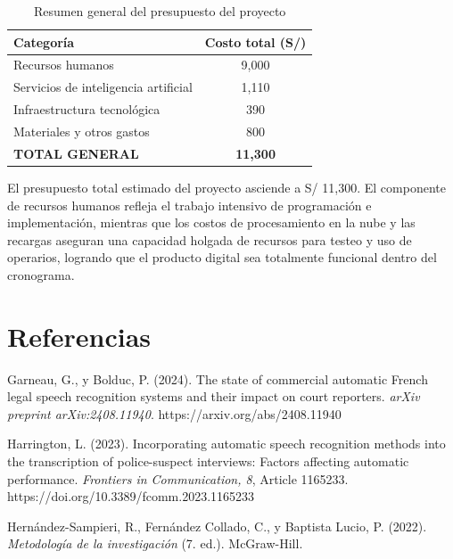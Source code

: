 \documentclass[12pt,a4paper,oneside]{article}
\begin{document}
\begin{table}[H]
\centering
\caption{Resumen general del presupuesto del proyecto}
\begin{tabular}{|p{6cm}|c|}
\hline
\rowcolor{gray!20}
\textbf{Categor\'ia} & \textbf{Costo total (S/)} \\
\hline
Recursos humanos & 9{,}000 \\
\hline
Servicios de inteligencia artificial & 1{,}110 \\
\hline
Infraestructura tecnol\'ogica & 390 \\
\hline
Materiales y otros gastos & 800 \\
\hline
\textbf{TOTAL GENERAL} & \textbf{11{,}300} \\
\hline
\end{tabular}
\label{tab:presupuesto_resumen}
\end{table}

El presupuesto total estimado del proyecto asciende a S/ 11{,}300. El componente de recursos humanos refleja el trabajo intensivo de programaci\'on e implementaci\'on, mientras que los costos de procesamiento en la nube y las recargas aseguran una capacidad holgada de recursos para testeo y uso de operarios, logrando que el producto digital sea totalmente funcional dentro del cronograma.


\section*{Referencias}
\setlength{\parindent}{0pt}
\setlength{\hangindent}{1.25cm}

Garneau, G., y Bolduc, P. (2024). The state of commercial automatic French legal speech recognition systems and their impact on court reporters. \textit{arXiv preprint arXiv:2408.11940}. https://arxiv.org/abs/2408.11940

\vspace{6pt}
Harrington, L. (2023). Incorporating automatic speech recognition methods into the transcription of police-suspect interviews: Factors affecting automatic performance. \textit{Frontiers in Communication, 8}, Article 1165233. https://doi.org/10.3389/fcomm.2023.1165233

\vspace{6pt}
Hern\'andez-Sampieri, R., Fern\'andez Collado, C., y Baptista Lucio, P. (2022). \textit{Metodolog\'ia de la investigaci\'on} (7.\textordfeminine{} ed.). McGraw-Hill.
\end{document}

